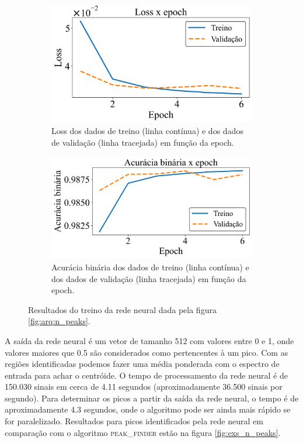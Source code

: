 \documentclass[a4paper,12pt,oneside]{book}
\begin{document}
\begin{figure}[H]
\centering
    \begin{subfigure}[t]{0.49\textwidth}
        \centering
        \includegraphics[scale=0.42]{figs/n_peaks_loss.png}
        \caption{Loss dos dados de treino (linha contínua) e dos dados de validação (linha tracejada) em função da epoch.}
        \label{subfig:n_peaks_loss}
    \end{subfigure}%
    \hfill
    \begin{subfigure}[t]{0.46\textwidth}
        \centering
        \includegraphics[scale=0.42]{figs/n_peaks_metric.png}
        \caption{Acurácia binária dos dados de treino (linha contínua) e dos dados de validação (linha tracejada) em função da epoch.}
        \label{subfig:n_peaks_metric}
    \end{subfigure}
\caption{Resultados do treino da rede neural dada pela figura \ref{fig:arq:n_peaks}.}
\label{fig:n_peaks_results}
\end{figure}

\par A saída da rede neural é um vetor de tamanho 512 com valores entre 0 e 1, onde valores maiores que 0.5 são considerados como pertencentes à um pico. Com as regiões identificadas podemos fazer uma média ponderada com o espectro de entrada para achar o centróide. O tempo de processamento da rede neural é de 150.030 sinais em cerca de 4.11 segundos (aproximadamente 36.500 sinais por segundo). Para determinar os picos a partir da saída da rede neural, o tempo é de aproximadamente 4.3 segundos, onde o algoritmo pode ser ainda mais rápido se for paralelizado. Resultados para picos identificados pela rede neural em comparação com o algoritmo \textsc{peak\_finder} estão na figura \ref{fig:exs_n_peaks}.
\end{document}

